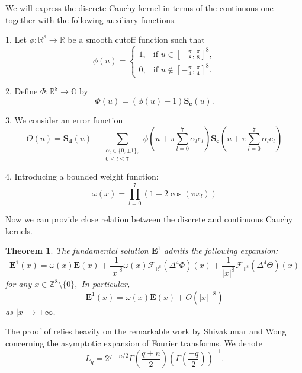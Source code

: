 \documentclass{amsart}
\newtheorem{theorem}{Theorem}[section]
\theoremstyle{definition}
\theoremstyle{remark}
\numberwithin{equation}{section}
\newcommand{\R}{\mathbb{R}}
\newcommand{\OO}{\mathbb O}
\newcommand{\Z}{\mathbb Z}
\begin{document}
We will express the discrete Cauchy kernel in terms of the continuous one together with the following auxiliary functions.

1. Let \( \phi:\mathbb R^8\to \mathbb R \) be a smooth cutoff function such that
\[ \phi(u) = \begin{cases}
	1, & \text{if } u \in \left[-\frac{\pi}{8},\frac{\pi}{8}\right]^8, \\
	0, & \text{if } u \notin \left[-\frac{\pi}{4},\frac{\pi}{4}\right]^8.
\end{cases} \]

2. Define \( \Phi:\mathbb R^8\to \OO \) by
  \[
\Phi(u) = (\phi(u) - 1) \bm{S_c}(u).
\]

3. We consider an error function
\[ \Theta(u) = \bm{S_d}(u) - \sum_{\substack{\alpha_l \in \{0, \pm 1\}, \\ 0 \leq l \leq 7}} \phi \left( u + \pi \sum_{l=0}^7 \alpha_l e_l \right) \bm{S_c} \left( u + \pi \sum_{l=0}^7 \alpha_l e_l \right) \]

4. Introducing a bounded weight function:
\[ \omega(x) = \prod_{l=0}^7 \left( 1 + 2\cos(\pi x_l) \right) \]



















Now we can provide close relation between the discrete and continuous Cauchy kernels.

\begin{theorem}\label{2023-09-30 10:43:11}
  The fundamental solution $\bm E^1$ admits the following expansion: \begin{equation}
        \label{2023-09-30 11:08:22}
        \bm E^1(x)= \omega(x) \bm E(x) + \frac{1}{|x|^8} \omega(x) \mathcal F_{\R^8} (\Delta^4 \Phi)(x) + \frac{1}{|x|^8} \mathcal F _{\mathbb T^8} (\Delta^4 \Theta) (x)
    \end{equation} for any $x\in   \Z^8\setminus \{0\},$   In particular, \[
\bm E^1(x) = \omega(x) \bm E(x) +O(|x|^{-8})
\]
 as  $|x|\rightarrow +\infty$.
\end{theorem}

The proof of   relies heavily on   the remarkable  work by Shivakumar and Wong
  \cite{SW1979}
  concerning the asymptotic
  expansion of Fourier transforms.
   We denote \[
L_{q}= 2^{q+n/2}  \Gamma\left(\dfrac{q+n}{2}\right) \left(\Gamma\left(\dfrac{-q}{2}\right)\right)^{-1}.
\]
\end{document}
